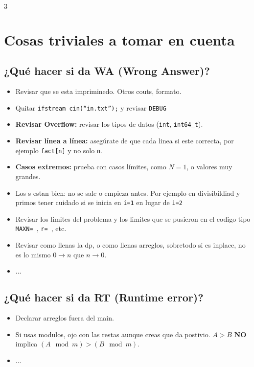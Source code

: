 \documentclass[8pt, spanish, mexico, letterpaper]{extarticle}
\newcommand{\rojo}[1]{\textcolor{red!80!black}{#1}}
\newcommand{\naranja}[1]{\textcolor{orange!50!red!80!black}{#1}}
\newcommand{\<}{<}
\begin{document}
\begin{multicols*}{3}
\section{Cosas triviales a tomar en cuenta}
\subsection*{  ¿Qué hacer si da \textbf{\rojo{WA} (\rojo Wrong \rojo Answer)}? }
\begin{itemize}
    \item Revisar que se esta impriminedo. Otros couts, formato.
    \item Quitar \texttt{ifstream cin(``in.txt'');} y revisar \texttt{DEBUG}
    \item \textbf{Revisar Overflow:} revisar los tipos de datos (\texttt{int}, \texttt{int64\_t}).
    \item \textbf{Revisar línea a línea:} asegúrate de que cada linea si este correcta, por ejemplo \texttt{fact[n]} y no solo \texttt{n}.
    \item \textbf{Casos extremos:} prueba con casos límites, como $N = 1$, o valores muy grandes.
    \item  Los s estan bien: no se sale o empieza antes. Por ejemplo en divisibildiad y primos tener cuidado si se inicia en \texttt{i=1} en lugar de \texttt{i=2}
    \item  Revisar los limites del problema y los limites que se pusieron en el codigo tipo \texttt{MAXN= }, \texttt{r= }, etc.
    \item  Revisar como llenas la dp, o como llenas arreglos, sobretodo si es inplace, no es lo mismo $0\to n$ que $n\to 0$.
    \item  ... 
\end{itemize}

\subsection*{¿Qué hacer si da \textbf{\naranja{RT} (\naranja Runtime  \naranja error)}?}
\begin{itemize}
    \item  Declarar arreglos fuera del main.
    \item  Si usas modulos, ojo con las restas aunque creas que da postivio. $A>B$ \textbf{NO} implica $(A \mod m )> (B \mod m)$.
    \item  ... 
\end{itemize}



\end{multicols*}
\end{document}
